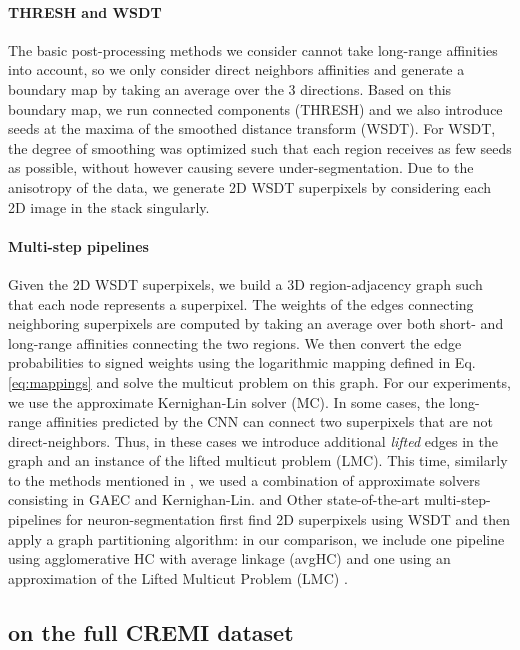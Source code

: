 \paragraph{THRESH and WSDT} The basic post-processing methods we consider cannot take long-range affinities into account, so we only consider direct neighbors affinities and generate a boundary map by taking an average over the 3 directions. Based on this boundary map, we run connected components (THRESH) and we also introduce seeds at the maxima of the smoothed distance transform (WSDT). For WSDT, the degree of smoothing was optimized such that each region receives as few seeds as possible, without however causing severe under-segmentation. Due to the anisotropy of the data, we generate 2D WSDT superpixels by considering each 2D image in the stack singularly.


\paragraph{Multi-step pipelines} Given the 2D WSDT superpixels, we build a 3D region-adjacency graph such that each node represents a superpixel. The weights of the edges connecting neighboring superpixels are computed by taking an average over both short- and long-range affinities connecting the two regions. We then convert the edge probabilities to signed weights using the logarithmic mapping defined in Eq. \ref{eq:mappings} and solve the multicut problem on this graph. For our experiments, we use the approximate Kernighan-Lin solver \cite{keuper2015efficient,kernighan1970efficient} (MC). In some cases, the long-range affinities predicted by the CNN can connect two superpixels that are not direct-neighbors. Thus, in these cases we introduce additional \emph{lifted} edges in the graph and an instance of the lifted multicut problem (LMC). This time, similarly to the methods mentioned in \cite{beier2016efficient}, we used a combination of approximate solvers consisting in GAEC and Kernighan-Lin. and      Other state-of-the-art multi-step-pipelines for neuron-segmentation first find 2D superpixels using WSDT and then apply a graph partitioning algorithm: in our comparison, we include one pipeline using agglomerative HC with average linkage (avgHC) and one using an approximation of the Lifted Multicut Problem (LMC) \cite{beier2016efficient}.

\subsection{\algname{} on the full CREMI dataset}

